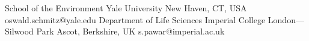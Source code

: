 

{
  {School of the Environment}
  {Yale University}
  {New Haven, CT, USA}
  {oswald.schmitz@yale.edu}
}
{
  {Department of Life Sciences}
  {Imperial College London---Silwood Park}
  {Ascot, Berkshire, UK}
  {s.pawar@imperial.ac.uk}
}